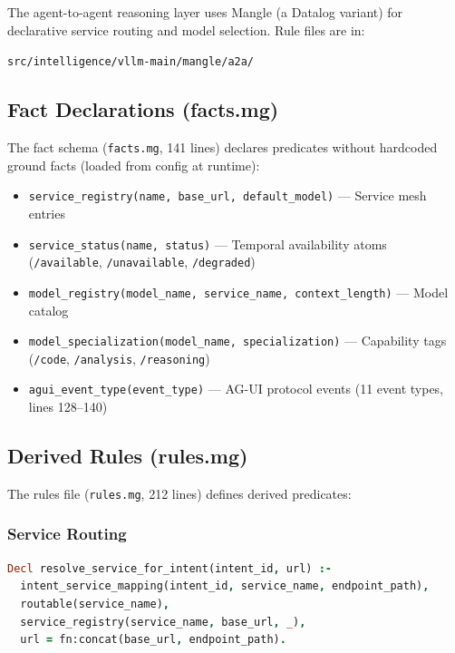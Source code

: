 \documentclass[11pt]{article}
\begin{document}
The agent-to-agent reasoning layer uses Mangle (a Datalog variant) for
declarative service routing and model selection. Rule files are in:
\begin{center}
\texttt{src/intelligence/vllm-main/mangle/a2a/}
\end{center}

\subsection{Fact Declarations (facts.mg)}

The fact schema (\texttt{facts.mg}, 141 lines) declares predicates without
hardcoded ground facts (loaded from config at runtime):

\begin{itemize}
  \item \texttt{service\_registry(name, base\_url, default\_model)} --- Service mesh entries
  \item \texttt{service\_status(name, status)} --- Temporal availability atoms (\texttt{/available}, \texttt{/unavailable}, \texttt{/degraded})
  \item \texttt{model\_registry(model\_name, service\_name, context\_length)} --- Model catalog
  \item \texttt{model\_specialization(model\_name, specialization)} --- Capability tags (\texttt{/code}, \texttt{/analysis}, \texttt{/reasoning})
  \item \texttt{agui\_event\_type(event\_type)} --- AG-UI protocol events (11 event types, lines 128--140)
\end{itemize}

\subsection{Derived Rules (rules.mg)}

The rules file (\texttt{rules.mg}, 212 lines) defines derived predicates:

\subsubsection{Service Routing}

\begin{lstlisting}[language=Prolog,caption={Intent resolution (rules.mg:25--29)}]
Decl resolve_service_for_intent(intent_id, url) :-
  intent_service_mapping(intent_id, service_name, endpoint_path),
  routable(service_name),
  service_registry(service_name, base_url, _),
  url = fn:concat(base_url, endpoint_path).
\end{lstlisting}
\end{document}
